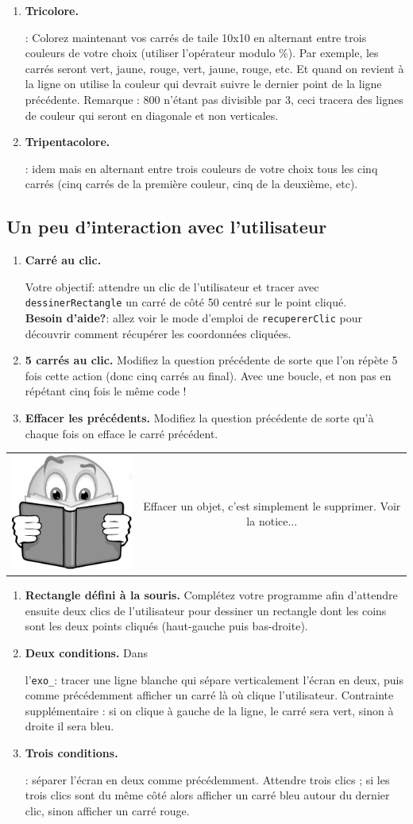 \documentclass[11pt,a4paper]{article}
\newcommand{\checkbox}{$\square$ \smallskip}
\newenvironment{lecture}{%
\smallskip
\begin{tabular}{c|c}
    \hspace{.03\textwidth} \includegraphics[width=.07\textwidth]{img/lecture.jpg} & 
\begin{minipage}{.85\textwidth}
}{%
\end{minipage}
\end{tabular}
}
\newcounter{exo} \setcounter{exo}{0}
\newenvironment{action}{%
    \begin{enumerate}[\numerotation] \addtocounter{exo}{-1}%
        }{%
    \end{enumerate}
}
\newcommand{\numexoa}{\theexo \addtocounter{exo}{1}}
\newcommand{\numerotation}{\checkbox \smallskip \numexoa.}
\newcounter{exoo} \setcounter{exoo}{0}
\newcommand{\numexo}{\theexoo}
\newcommand{\repexo}{{\tt exo_\numexo}}
\newcommand{\exoplus}{\addtocounter{exoo}{1}}
\begin{document}
\begin{action}
\item {\bf Tricolore.} \exoplus \repexo : Colorez maintenant vos carrés de taile 10x10 en alternant entre trois couleurs de votre choix (utiliser l'opérateur modulo \%). Par exemple, les carrés seront vert, jaune, rouge, vert, jaune, rouge, etc. Et quand on revient à la ligne on utilise la couleur qui devrait suivre le dernier point de la ligne précédente. Remarque : 800 n'étant pas divisible par 3, ceci tracera des lignes de couleur qui seront en diagonale et non verticales.
\item {\bf Tripentacolore.} \exoplus \repexo : idem mais en alternant entre trois couleurs de votre choix tous les cinq carrés (cinq carrés de la première couleur, cinq de la deuxième, etc).
\end{action}

\subsection*{Un peu d'interaction avec l'utilisateur}
\begin{action}
\item {\bf Carré au clic.} \exoplus \repexo Votre objectif: attendre un clic de l'utilisateur et tracer avec {\tt dessinerRectangle} un carré de côté 50 centré sur le point cliqué. \\
{\bf Besoin d'aide?}: allez voir le mode d'emploi de {\tt recupererClic} pour découvrir comment récupérer les coordonnées cliquées.
\item {\bf 5 carrés au clic.} Modifiez la question précédente de sorte que l'on répète 5 fois cette action (donc cinq carrés au final). Avec une boucle, et non pas en répétant cinq fois le même code !
\item {\bf Effacer les précédents.} Modifiez la question précédente de sorte qu'à chaque fois on efface le carré précédent.
\end{action}

\begin{lecture}
    Effacer un objet, c'est simplement le supprimer. Voir la notice...
\end{lecture}
\begin{action}

\item {\bf Rectangle défini à la souris.} Complétez votre programme afin d'attendre ensuite deux clics de l'utilisateur pour dessiner un rectangle dont les coins sont les deux points cliqués (haut-gauche puis bas-droite).

\item {\bf Deux conditions.} Dans \exoplus l'\repexo : tracer une ligne blanche qui sépare verticalement l'écran en deux, puis comme précédemment afficher un carré là où clique l'utilisateur. Contrainte supplémentaire : si on clique à gauche de la ligne, le carré sera vert, sinon à droite il sera bleu.
\item {\bf Trois conditions.} \exoplus \repexo : séparer l'écran en deux comme précédemment. Attendre trois clics ; si les trois clics sont du même côté alors afficher un carré bleu autour du dernier clic, sinon afficher un carré rouge.
\end{action}
\end{document}
